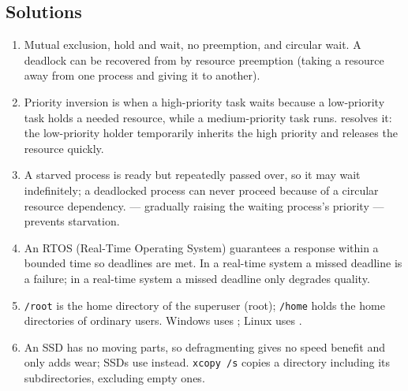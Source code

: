 \documentclass[11pt]{article}
\begin{document}
\subsection*{Solutions}
\begingroup\small
\begin{enumerate}[label=\arabic*.]
  \item Mutual exclusion, hold and wait, no preemption, and circular wait. A
    deadlock can be recovered from by resource preemption (taking a resource
    away from one process and giving it to another).
  \item Priority inversion is when a high-priority task waits because a
    low-priority task holds a needed resource, while a medium-priority task
    runs.  resolves it: the low-priority holder
    temporarily inherits the high priority and releases the resource quickly.
  \item A starved process is ready but repeatedly passed over, so it may wait
    indefinitely; a deadlocked process can never proceed because of a circular
    resource dependency.  --- gradually raising the waiting
    process's priority --- prevents starvation.
  \item An RTOS (Real-Time Operating System) guarantees a response within a
    bounded time so deadlines are met. In a  real-time system a
    missed deadline is a failure; in a  real-time system a missed
    deadline only degrades quality.
  \item \texttt{/root} is the home directory of the superuser (root);
    \texttt{/home} holds the home directories of ordinary users. Windows uses
    ; Linux uses .
  \item An SSD has no moving parts, so defragmenting gives no speed benefit and
    only adds wear; SSDs use  instead. \texttt{xcopy /s} copies a
    directory including its subdirectories, excluding empty ones.
\end{enumerate}
\endgroup
\end{document}

